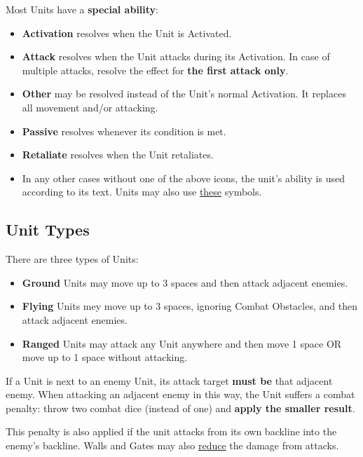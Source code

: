 \begin{multicols}{2}
\vspace*{\fill}

Most Units have a \textbf{special ability}:\par
\begin{itemize}[wide]
  \item\textbf{Activation}  resolves when the Unit is Activated.
  \item\textbf{Attack}  resolves when the Unit attacks during its Activation.
    In case of multiple attacks, resolve the effect for \textbf{the first attack only}.
  \item\textbf{Other}  may be resolved instead of the Unit's normal Activation.
    It replaces all movement and/or attacking.
  \item\textbf{Passive}  resolves whenever its condition is met.
  \item\textbf{Retaliate}  resolves when the Unit retaliates.
  \item In any other cases without one of the above icons, the unit's ability is used according to its text.
    Units may also use \hyperlink{Playerdecks}{these} symbols.
\end{itemize}

\vspace*{\fill}

\columnbreak

\subsection*{\hypertarget{Unittype}{Unit Types}}
There are three types of Units:
\begin{itemize}
  \item \textbf{Ground}  Units may move up to 3 spaces and then attack adjacent enemies.
  \item \textbf{Flying}  Units mey move up to 3 spaces, ignoring Combat Obstacles, and then attack adjacent enemies.
  \item \textbf{Ranged}  Units may attack any Unit anywhere and then move 1 space OR move up to 1 space without attacking.
\end{itemize}
If a  Unit is next to an enemy Unit, its attack target \textbf{must be} that adjacent enemy.
When attacking an adjacent enemy in this way, the  Unit suffers a combat penalty: throw two combat dice (instead of one) and \textbf{apply the smaller result}.\par
This penalty is also applied if the  unit attacks from its own backline into the enemy's backline.
Walls and Gates may also \hyperlink{Walls}{reduce} the damage from   attacks.


\end{multicols}
